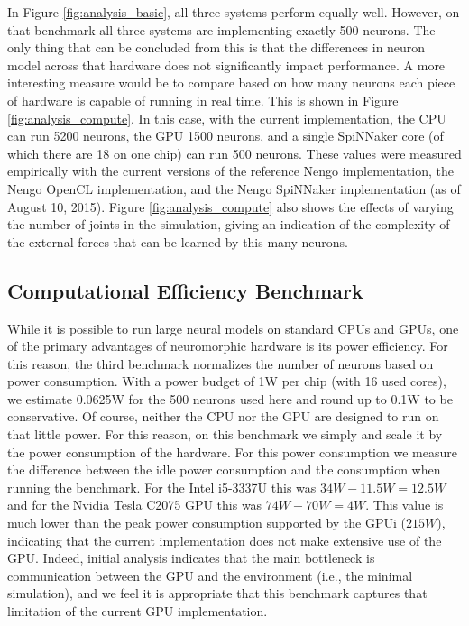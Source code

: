 \documentclass{frontiersSCNS} %
\begin{document}
In Figure \ref{fig:analysis_basic}, all three systems perform equally well.
However, on that benchmark all three systems are implementing exactly 500
neurons.  The only thing that can be concluded from this is that the
differences in neuron model across that hardware does not significantly
impact performance.  A more interesting measure would be to compare based
on how many neurons each piece of hardware is capable of running in real time.
This is shown in Figure \ref{fig:analysis_compute}.  In this case, with the
current implementation, the CPU can
run 5200 neurons, the GPU 1500 neurons, and a single SpiNNaker core (of which
there are 18 on one chip) can run 500
neurons.  These values were measured empirically with the current versions
of the reference Nengo implementation, the Nengo OpenCL implementation,
and the Nengo SpiNNaker implementation (as of August 10, 2015).  
Figure \ref{fig:analysis_compute}
also shows the effects of varying the number of joints in the simulation,
giving an indication of the complexity of the external forces that can be
learned by this many neurons.

\subsection{Computational Efficiency Benchmark}

While it is possible to run large neural models on standard CPUs and GPUs,
one of the primary advantages of neuromorphic hardware is its power
efficiency.  For this reason, the third benchmark normalizes the number of neurons
based on power consumption.  With a power budget of 1W per chip (with 16 used cores),
we estimate 0.0625W for the 500 neurons used here and round up to 0.1W to be
conservative.  Of course, neither the CPU nor the
GPU are designed to run on that little power.  For this reason,
on this benchmark we simply and scale it by the power consumption of the hardware.
For this power consumption we measure the difference between the idle power
consumption and the consumption when running the benchmark.  For the Intel
i5-3337U this was $34W - 11.5W = 12.5W$ and for the Nvidia Tesla C2075 GPU
this was $74W - 70W = 4W$.  This value is much lower than the peak power
consumption supported by the GPUi ($215W$), indicating that the current implementation
does not make extensive use of the GPU.  Indeed, initial analysis indicates that
the main bottleneck is communication between the GPU and the environment (i.e.,
the minimal simulation), and we feel it is appropriate that this benchmark
captures that limitation of the current GPU implementation.
\end{document}
